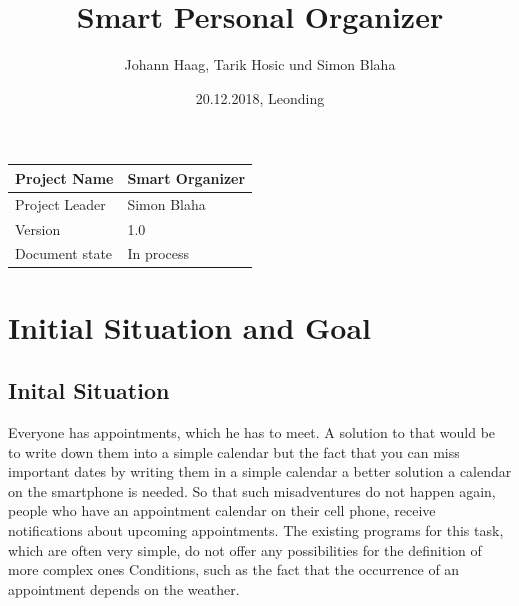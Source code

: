 \documentclass[12pt]{scrartcl}
\title{Smart Personal Organizer}
\author{Johann Haag, Tarik Hosic und Simon Blaha}
\date{20.12.2018, Leonding}
\begin{document}
    \maketitle
    \begin{flushleft}
    \begin{tabular}{|l|l|}
    \hline
    Project Name & Smart Organizer \\ \hline
    Project Leader & Simon Blaha \\ \hline
    Version & 1.0\\ \hline
    Document state & In process \\ \hline
    \end{tabular}
    \end{flushleft}

    \pagebreak
    \tableofcontents
    \pagebreak


    \section{Initial Situation and Goal}                        %

    \subsection{Inital Situation}
        Everyone has appointments, which he has to meet. A solution to that would be to write down them into a simple calendar but
        the fact that you can miss important dates by writing them in a simple calendar a better solution a calendar on the smartphone is needed.
        So that such misadventures do not happen again, people who have an appointment calendar on their cell phone, receive notifications about upcoming appointments.
        The existing programs for this task, which are often very simple, do not offer any possibilities for the definition of more complex ones
        Conditions, such as the fact that the occurrence of an appointment depends on the weather.
\end{document}
